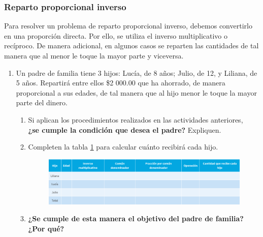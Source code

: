 \documentclass[11pt]{book}
\begin{document}
\subsubsection{Reparto proporcional inverso}
\begin{boxH}
  Para resolver un problema de reparto proporcional inverso, debemos convertirlo en una proporción directa. Por ello, se utiliza el inverso multiplicativo o recíproco.
  De manera adicional, en algunos casos se reparten las cantidades de tal manera que al menor le toque la mayor parte y viceversa.
\end{boxH}
\begin{enumerate}
  \item Un padre de familia tiene 3 hijos: Lucía, de 8 años; Julio, de 12, y Liliana, de 5 años. Repartirá entre ellos \$2 000.00 que ha ahorrado, de manera proporcional a sus edades, de tal manera que al hijo menor le toque la mayor parte del dinero.
        \begin{enumerate}
          \item Si aplican los procedimientos realizados en las actividades anteriores,\\
                \textbf{¿se cumple la condición que desea el padre?} Expliquen.\\[0.5cm]

          \item Completen la tabla \ref{tab:reparto_hijos} para calcular cuánto recibirá cada hijo.
                \begin{figure}[H]
                  \centering
                  \includegraphics[width=\textwidth]{reparto_hijos}
                  \label{tab:reparto_hijos}
                \end{figure}
          \item \textbf{¿Se cumple de esta manera el objetivo del padre de familia? ¿Por qué?}\\[0.5cm]
        \end{enumerate}


\end{enumerate}
\end{document}
